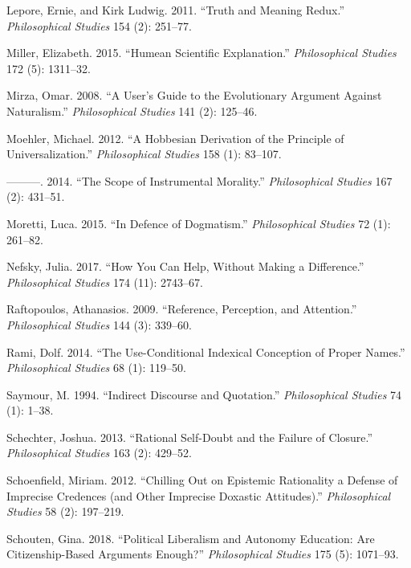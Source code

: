 \documentclass[
  10pt,
  letterpaper,
  DIV=11,
  numbers=noendperiod,
  twoside]{scrartcl}
\newlength{\cslhangindent}
\newenvironment{CSLReferences}[2] %
 {\begin{list}{}{%
  \setlength{\itemindent}{0pt}
  \setlength{\leftmargin}{0pt}
  \setlength{\parsep}{0pt}
  \ifodd #1
   \setlength{\leftmargin}{\cslhangindent}
   \setlength{\itemindent}{-1\cslhangindent}
  \fi
  \setlength{\itemsep}{#2\baselineskip}}}
 {\end{list}}
\begin{document}
\begin{CSLReferences}{1}{0}
Lepore, Ernie, and Kirk Ludwig. 2011. {``Truth and Meaning Redux.''}
\emph{Philosophical Studies} 154 (2): 251--77.

Miller, Elizabeth. 2015. {``Humean Scientific Explanation.''}
\emph{Philosophical Studies} 172 (5): 1311--32.

Mirza, Omar. 2008. {``A User's Guide to the Evolutionary Argument
Against Naturalism.''} \emph{Philosophical Studies} 141 (2): 125--46.

Moehler, Michael. 2012. {``A Hobbesian Derivation of the Principle of
Universalization.''} \emph{Philosophical Studies} 158 (1): 83--107.

---------. 2014. {``The Scope of Instrumental Morality.''}
\emph{Philosophical Studies} 167 (2): 431--51.

Moretti, Luca. 2015. {``In Defence of Dogmatism.''} \emph{Philosophical
Studies} 72 (1): 261--82.

Nefsky, Julia. 2017. {``How You Can Help, Without Making a
Difference.''} \emph{Philosophical Studies} 174 (11): 2743--67.

Raftopoulos, Athanasios. 2009. {``Reference, Perception, and
Attention.''} \emph{Philosophical Studies} 144 (3): 339--60.

Rami, Dolf. 2014. {``The Use-Conditional Indexical Conception of Proper
Names.''} \emph{Philosophical Studies} 68 (1): 119--50.

Saymour, M. 1994. {``Indirect Discourse and Quotation.''}
\emph{Philosophical Studies} 74 (1): 1--38.

Schechter, Joshua. 2013. {``Rational Self-Doubt and the Failure of
Closure.''} \emph{Philosophical Studies} 163 (2): 429--52.

Schoenfield, Miriam. 2012. {``Chilling Out on Epistemic Rationality a
Defense of Imprecise Credences (and Other Imprecise Doxastic
Attitudes).''} \emph{Philosophical Studies} 58 (2): 197--219.

Schouten, Gina. 2018. {``Political Liberalism and Autonomy Education:
Are Citizenship-Based Arguments Enough?''} \emph{Philosophical Studies}
175 (5): 1071--93.


\end{CSLReferences}
\end{document}
